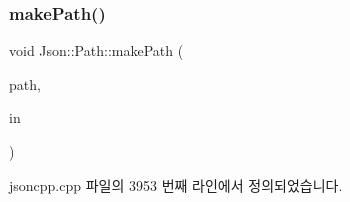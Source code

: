 \subsubsection{\texorpdfstring{make\+Path()}{makePath()}}
{\footnotesize\ttfamily void Json\+::\+Path\+::make\+Path (\begin{DoxyParamCaption}\item[{const \hyperlink{json_8h_a1e723f95759de062585bc4a8fd3fa4be}{J\+S\+O\+N\+C\+P\+P\+\_\+\+S\+T\+R\+I\+NG} \&}]{path,  }\item[{const \hyperlink{class_json_1_1_path_ab29d7b2fc896c7d3c5ed4609af3a3f23}{In\+Args} \&}]{in }\end{DoxyParamCaption})\hspace{0.3cm}{\ttfamily [private]}}



jsoncpp.\+cpp 파일의 3953 번째 라인에서 정의되었습니다.


